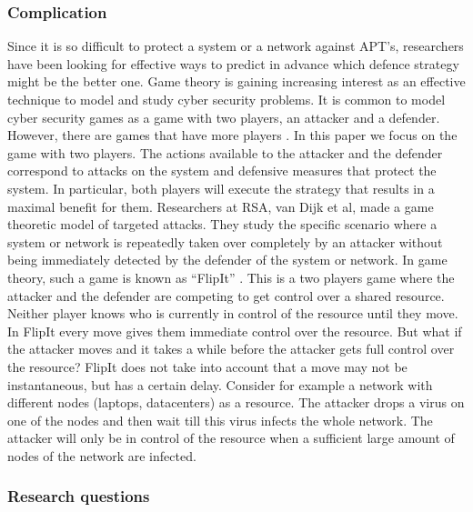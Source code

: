 \subsubsection{Complication}
Since it is so difficult to protect a system or a network against APT's, researchers have been looking for effective ways to predict in advance which defence strategy might be the better one. 
Game theory is gaining increasing interest as an effective technique to model and study cyber security problems. It is common to model cyber security games as a game with two players, an attacker and a defender. However, there are games that have more players \cite{fengstealthy}. In this paper we focus on the game with two players. The actions available to the attacker and the defender correspond to attacks on the system and defensive measures that protect the system. In particular, both players will execute the strategy that results in a maximal benefit for them.  Researchers at RSA, van Dijk et al,  made a game theoretic model of targeted attacks. They study the specific scenario where a system or network is repeatedly taken over completely by an attacker without being immediately detected by the defender of the system or network. In game theory, such a game is known as ``FlipIt'' \cite{FlipIt}. This is a two players game where the attacker and the defender are competing to get control over a shared resource. Neither player knows who is currently in control of the resource until they move. In FlipIt every move gives them immediate control over the resource. But what if the attacker moves and it takes a while before the attacker gets full control over the resource? FlipIt does not take into account that a move may not be instantaneous, but has a certain delay. Consider for example a network with different nodes (laptops, datacenters) as a resource. The attacker drops a virus on one of the nodes and then wait till this virus infects the whole network. The attacker will only be in control of the resource when a sufficient large amount of nodes of the network are infected. \\

\subsubsection{Research questions}


